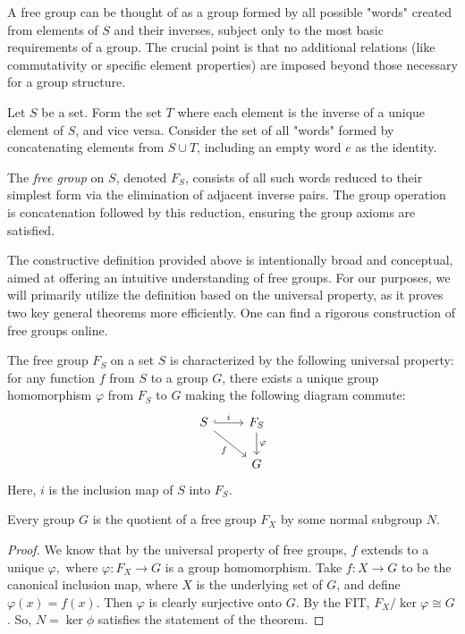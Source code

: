 A free group can be thought of as a group formed by all possible "words" created from elements of \(S\) and their inverses, subject only to the most basic requirements of a group. The crucial point is that no additional relations (like commutativity or specific element properties) are imposed beyond those necessary for a group structure.

\begin{definition}
Let \(S\) be a set. Form the set \(T\) where each element is the inverse of a unique element of \(S\), and vice versa. Consider the set of all "words" formed by concatenating elements from \(S \cup T\), including an empty word \(e\) as the identity.

The \emph{free group} on \(S\), denoted \(F_S\), consists of all such words reduced to their simplest form via the elimination of adjacent inverse pairs. The group operation is concatenation followed by this reduction, ensuring the group axioms are satisfied.
\end{definition}

\begin{remark}
The constructive definition provided above is intentionally broad and conceptual, aimed at offering an intuitive understanding of free groups. For our purposes, we will primarily utilize the definition based on the universal property, as it proves two key general theorems more efficiently. One can find a rigorous construction of free groups online.
\end{remark}


\begin{definition}
The free group \(F_S\) on a set \(S\) is characterized by the following universal property: for any function \(f\) from \(S\) to a group \(G\), there exists a unique group homomorphism \(\varphi\) from \(F_S\) to \(G\) making the following diagram commute:
\[
\begin{tikzcd}
S \arrow[r, hook, "i"] \arrow[rd, "f"'] & F_S \arrow[d, "\varphi"] \\
 & G
\end{tikzcd}
\]
Here, \(i\) is the inclusion map of \(S\) into \(F_S\).
\end{definition}

\begin{theorem}
    Every group $G$ is the quotient of a free group $F_X$ by some normal subgroup $N$.
\end{theorem}

\begin{proof}
    We know that by the universal property of free groups, $f$ extends to a unique $\varphi,$ where $\varphi:F_X \to G$ is a group homomorphism. Take $f: X \to G$ to be the canonical inclusion map, where $X$ is the underlying set of $G$, and define $\varphi(x) = f(x).$ Then $\varphi$ is clearly surjective onto $G.$ By the FIT, $F_X/\ker \varphi \cong G$. So, $N = \ker \phi$ satisfies the statement of the theorem.
\end{proof}

